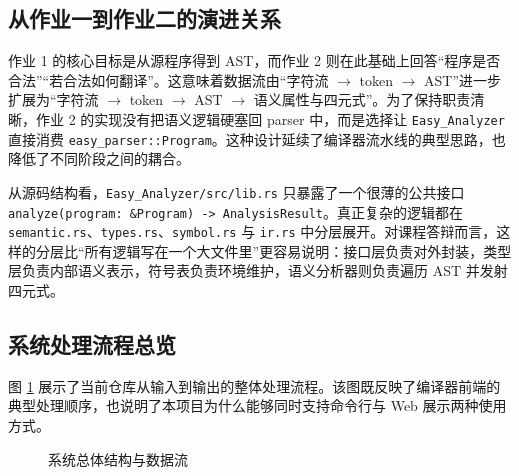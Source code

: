 \documentclass[UTF8,a4paper,12pt]{ctexart}
\newcommand{\pkg}[1]{\texttt{#1}}
\begin{document}
\subsection{从作业一到作业二的演进关系}

作业 1 的核心目标是从源程序得到 AST，而作业 2 则在此基础上回答“程序是否合法”“若合法如何翻译”。这意味着数据流由“字符流 $\rightarrow$ token $\rightarrow$ AST”进一步扩展为“字符流 $\rightarrow$ token $\rightarrow$ AST $\rightarrow$ 语义属性与四元式”。为了保持职责清晰，作业 2 的实现没有把语义逻辑硬塞回 parser 中，而是选择让 \pkg{Easy\_Analyzer} 直接消费 \pkg{easy\_parser::Program}。这种设计延续了编译器流水线的典型思路，也降低了不同阶段之间的耦合。

从源码结构看，\pkg{Easy\_Analyzer/src/lib.rs} 只暴露了一个很薄的公共接口 \pkg{analyze(program: \&Program) -> AnalysisResult}。真正复杂的逻辑都在 \pkg{semantic.rs}、\pkg{types.rs}、\pkg{symbol.rs} 与 \pkg{ir.rs} 中分层展开。对课程答辩而言，这样的分层比“所有逻辑写在一个大文件里”更容易说明：接口层负责对外封装，类型层负责内部语义表示，符号表负责环境维护，语义分析器则负责遍历 AST 并发射四元式。

\subsection{系统处理流程总览}

图 \ref{fig:system-architecture} 展示了当前仓库从输入到输出的整体处理流程。该图既反映了编译器前端的典型处理顺序，也说明了本项目为什么能够同时支持命令行与 Web 展示两种使用方式。

\begin{figure}[H]
    \centering
    \caption{系统总体结构与数据流}
    \label{fig:system-architecture}
\end{figure}
\end{document}
